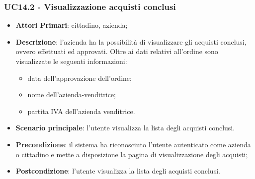 \subsubsection{UC14.2 - Visualizzazione acquisti conclusi}
\begin{itemize}
	\item \textbf{Attori Primari}: cittadino, azienda;
	\item \textbf{Descrizione}: l'azienda ha la possibilità di visualizzare gli acquisti conclusi, ovvero effettuati ed approvati. Oltre ai dati relativi all'ordine sono visualizzate le seguenti informazioni:
	\begin{itemize}
		\item data dell'approvazione dell'ordine;
		\item nome dell'azienda-venditrice;
		\item partita IVA dell'azienda venditrice.
	\end{itemize}
	\item \textbf{Scenario principale}: l'utente visualizza la lista degli acquisti conclusi. 
	\item \textbf{Precondizione}: il sistema ha riconosciuto l’utente autenticato come azienda o cittadino e
	mette a disposizione la pagina di visualizzazione degli acquisti;
	\item \textbf{Postcondizione}: l'utente visualizza la lista degli acquisti conclusi.
\end{itemize}

